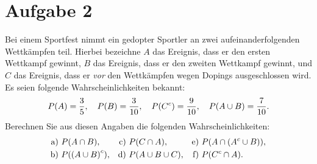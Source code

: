 \documentclass{exercise}
\begin{document}
    \section*{Aufgabe 2}

    \begin{problem}
        Bei einem Sportfest nimmt ein gedopter Sportler an zwei aufeinanderfolgenden Wettkämpfen teil.
        Hierbei bezeichne \(A\) das Ereignis, dass er den ersten Wettkampf gewinnt, \(B\) das Ereignis, dass er den zweiten Wettkampf gewinnt, und \(C\) das Ereignis, dass er \emph{vor} den Wettkämpfen wegen Dopings ausgeschlossen wird.
        Es seien folgende Wahrscheinlichkeiten bekannt:
        \[
            P\parentheses*{A} = \frac{3}{5}, \quad P\parentheses*{B} = \frac{3}{10}, \quad P\parentheses*{C^c} = \frac{9}{10}, \quad P\parentheses*{A \cup B} = \frac{7}{10}.
        \]
        Berechnen Sie aus diesen Angaben die folgenden Wahrscheinlichkeiten:
        \begin{align*}
            \text{a) }&P\parentheses*{A \cap B}, & \text{c) }&P\parentheses*{C \cap A}, & \text{e) }&P\parentheses*{A \cap \parentheses*{A^c \cup B}},\\
            \text{b) }&P\parentheses*{\parentheses*{A \cup B}^c}, & \text{d) }&P\parentheses*{A \cup B \cup C}, & \text{f) }&P\parentheses*{C^c \cap A}.
        \end{align*}
    \end{problem}
\end{document}
